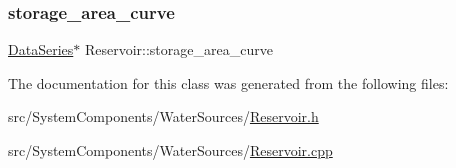 \mbox{\label{classReservoir_a46bd5b750963dfa9a57b247fd77ab8ff_a46bd5b750963dfa9a57b247fd77ab8ff}} 
\subsubsection{\texorpdfstring{storage\+\_\+area\+\_\+curve}{storage\_area\_curve}}
{\footnotesize\ttfamily \mbox{\hyperlink{classDataSeries}{Data\+Series}}$\ast$ Reservoir\+::storage\+\_\+area\+\_\+curve\hspace{0.3cm}{\ttfamily [protected]}}



The documentation for this class was generated from the following files\+:\begin{DoxyCompactItemize}
\item 
src/\+System\+Components/\+Water\+Sources/\mbox{\hyperlink{Reservoir_8h}{Reservoir.\+h}}\item 
src/\+System\+Components/\+Water\+Sources/\mbox{\hyperlink{Reservoir_8cpp}{Reservoir.\+cpp}}\end{DoxyCompactItemize}
